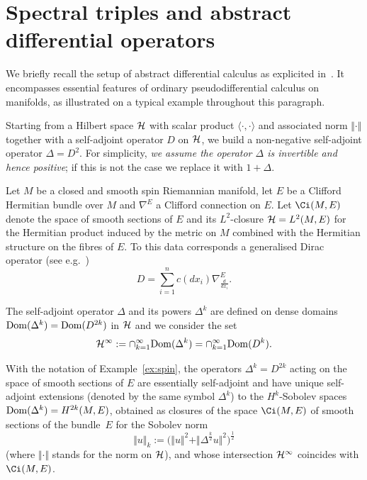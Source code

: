 \section{Spectral triples and abstract dif\/ferential operators}\label{section2}

We brief\/ly recall the setup of abstract dif\/ferential calculus as
explicited in~\cite{Hig}. It encompasses essential features of ordinary
pseudodif\/ferential calculus on manifolds, as  illustrated on a typical
example throughout this paragraph.

 Starting from a Hilbert space $ {\cal H}$ with scalar product $\langle\cdot, \cdot\rangle$ and associated norm $\Vert \cdot\Vert$ together with   a
self-adjoint operator $D$ on ${\cal H}$, we build a
non-negative self-adjoint operator $\Delta= D^2$.  For simplicity,  {\it we assume
the operator $\Delta$ is
invertible and hence positive}; if this is not the case we replace it  with
$1+\Delta$.
\begin{example}\label{ex:spin} Let $M$ be a closed and  smooth spin Riemannian  manifold, let  $E$
 be  a Clif\/ford Hermitian bundle
  over $M$ and $\nabla^E$ a Clif\/ford connection on $E$. Let $\Ci(M,E)$ denote
  the space of smooth sections of $E$ and  its $L^2$-closure ${\cal H}=L^2(M, E)$ for
  the Hermitian product induced by the metric on $M$ combined with the Hermitian
  structure on the f\/ibres of $E$. To this data corresponds a generalised Dirac
  operator (see e.g.~\cite{BGV})
  \[
  D= \sum_{i=1}^n c(dx_i)
  \nabla_{\frac{d}{dx_i}}^E.
  \]
\end{example}

 The self-adjoint operator $\Delta$ and its powers $\Delta^k$ are def\/ined on
 dense  domains    $ {\rm
    Dom}(\Delta^k)={\rm
    Dom}(D^{2k})$ in ${\cal H}$ and we consider the set
    \[
    {\cal H}^\infty:= \cap_{k=1}^\infty {\rm
    Dom}(\Delta^k)=\cap_{k=1}^\infty {\rm
    Dom}(D^k).
    \]

\begin{example}
With the notation of Example~\ref{ex:spin},  the operators
$\Delta^k=D^{2k}$ acting on the space of smooth sections of $E$ are essentially self-adjoint and have  unique self-adjoint extensions (denoted by the same symbol $\Delta^k$) to the   $H^k$-Sobolev spaces
  ${\rm Dom}(\Delta^k)=H^{2k}(M, E)$, obtained as closures of the space
  $\Ci(M,E)$ of smooth sections of the bundle~$E$ for the Sobolev norm
\[
\Vert u\Vert_{k}:= \big(\Vert u\Vert^2+ \Vert \Delta^{\frac{k}{2}}  u\Vert^2\big)^{\frac{1}{2}}
 \]
 (where $\Vert\cdot\Vert$ stands for the norm
on ${\cal H}$), and whose intersection ${\cal H}^\infty$
  coincides with  $\Ci(M, E)$.
\end{example}


